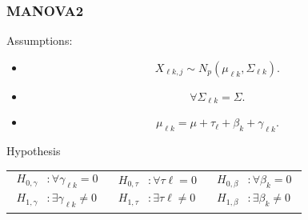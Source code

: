 \documentclass[aspectratio=169,10pt,t]{beamer}
\begin{document}
\begin{frame}[t]
	\frametitle{MANOVA2}

	Assumptions:
	\begin{itemize}
		\item 
			\[
				X_{\ell k,j} \sim N_{p}  \left( \mu_{\ell k}, \Sigma_{\ell k}  \right) 
			.\] 
		\item 
			\[
				\forall \Sigma_{\ell k} = \Sigma
			.\] 
		\item 
			\[
				\mu_{\ell k} = \mu + \tau_{\ell} + \beta_{k} + \gamma_{\ell k}
			.\] 
	\end{itemize}

	Hypothesis\\
	\begin{centering}

		\begin{tabular}{ccc}
			$
			\begin{aligned}
				H_{0,\gamma} &: \forall \gamma_{\ell k} = 0\\
				H_{1,\gamma} &: \exists \gamma_{\ell k} \neq 0
			\end{aligned}
			$ & $
			\begin{aligned}
				H_{0,\tau} &: \forall \tau{\ell} = 0\\
				H_{1,\tau} &: \exists \tau{\ell} \neq 0
			\end{aligned}
			$	& $
			\begin{aligned}
				H_{0,\beta} &: \forall \beta_{k} = 0\\
				H_{1,\beta} &: \exists \beta_{k} \neq 0
			\end{aligned}
			$
		\end{tabular}
	\end{centering}
\end{frame}
\end{document}
